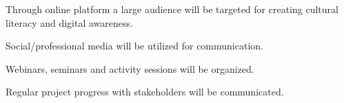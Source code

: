 \item Through online platform a large audience will be targeted for creating cultural literacy and digital awareness.
\item Social/professional media will be utilized for communication.
\item Webinars, seminars and activity sessions will be organized.
\item Regular project progress with stakeholders will be communicated.
